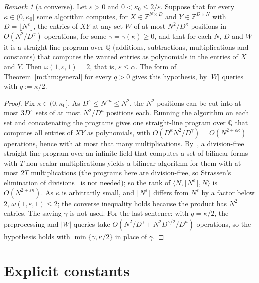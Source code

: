 \documentclass[11pt]{article}
\theoremstyle{definition}
\theoremstyle{remark}
\newtheorem{remark}[theorem]{Remark}
\newcommand{\Z}{\mathbb{Z}}
\newcommand{\Q}{\mathbb{Q}}
\begin{document}
\begin{remark}[a converse]\label{m:rem:converse}
Let $\varepsilon>0$ and $0<\kappa_0\le2/\varepsilon$. Suppose that for every $\kappa\in(0,\kappa_0]$ some algorithm computes, for $X\in\Z^{N\times D}$ and $Y\in\Z^{D\times N}$ with $D=\lfloor N^\varepsilon\rfloor$, the entries of $XY$ at any set $W$ of at most $N^2/D^\kappa$ positions in $O(N^2/D^\gamma)$ operations, for some $\gamma=\gamma(\kappa)\ge0$, and that for each $N$, $D$ and $W$ it is a straight-line program over $\Q$ (additions, subtractions, multiplications and constants) that computes the wanted entries as polynomials in the entries of $X$ and $Y$. Then $\omega(1,\varepsilon,1)=2$, that is, $\varepsilon\le\alpha$. The form of Theorem~\ref{m:thm:general} for every $q>0$ gives this hypothesis, by $|W|$ queries with $q:=\kappa/2$.
\end{remark}

\begin{proof}
Fix $\kappa\in(0,\kappa_0]$. As $D^\kappa\le N^{\varepsilon\kappa}\le N^2$, the $N^2$ positions can be cut into at most $3D^\kappa$ sets of at most $N^2/D^\kappa$ positions each. Running the algorithm on each set and concatenating the programs gives one straight-line program over $\Q$ that computes all entries of $XY$ as polynomials, with $O(D^\kappa N^2/D^\gamma)=O(N^{2+\varepsilon\kappa})$ operations, hence with at most that many multiplications. By~\cite[Proposition~14.1]{BCS97}, a division-free straight-line program over an infinite field that computes a set of bilinear forms with $T$ non-scalar multiplications yields a bilinear algorithm for them with at most $2T$ multiplications (the programs here are division-free, so Strassen's elimination of divisions~\cite{Str73} is not needed); so the rank of $\langle N,\lfloor N^\varepsilon\rfloor,N\rangle$ is $O(N^{2+\varepsilon\kappa})$. As $\kappa$ is arbitrarily small, and $\lfloor N^\varepsilon\rfloor$ differs from $N^\varepsilon$ by a factor below $2$, $\omega(1,\varepsilon,1)\le2$; the converse inequality holds because the product has $N^2$ entries. The saving $\gamma$ is not used. For the last sentence: with $q=\kappa/2$, the preprocessing and $|W|$ queries take $O(N^2/D^\gamma+N^2D^{\kappa/2}/D^\kappa)$ operations, so the hypothesis holds with $\min\{\gamma,\kappa/2\}$ in place of $\gamma$.
\end{proof}

\section{Explicit constants}\label{m:sec:explicit}
\end{document}
